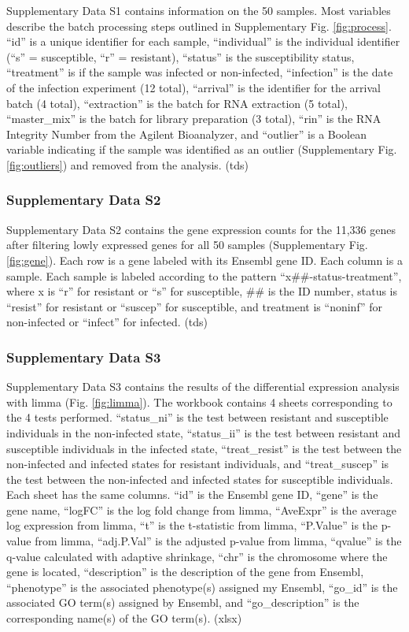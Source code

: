 \documentclass[fleqn,10pt]{wlscirep}
\begin{document}
Supplementary Data S1 contains information on the 50 samples. Most
variables describe the batch processing steps outlined in
Supplementary Fig. \ref{fig:process}. “id” is a unique identifier for
each sample, “individual” is the individual identifier (“s” =
susceptible, “r” = resistant), “status” is the susceptibility status,
“treatment” is if the sample was infected or non-infected, “infection”
is the date of the infection experiment (12 total), “arrival” is the
identifier for the arrival batch (4 total), “extraction” is the batch
for RNA extraction (5 total), “master\_mix” is the batch for library
preparation (3 total), “rin” is the RNA Integrity Number from the
Agilent Bioanalyzer, and “outlier” is a Boolean variable indicating if
the sample was identified as an outlier (Supplementary Fig.
\ref{fig:outliers}) and removed from the analysis. (tds)
\subsubsection*{Supplementary Data S2}

Supplementary Data S2 contains the gene expression counts for the
11,336 genes after filtering lowly expressed genes for all 50 samples
(Supplementary Fig. \ref{fig:gene}). Each row is a gene labeled with
its Ensembl gene ID. Each column is a sample. Each sample is labeled
according to the pattern “x\#\#-status-treatment”, where x is “r” for
resistant or “s” for susceptible, \#\# is the ID number, status is
“resist” for resistant or “suscep” for susceptible, and treatment is
“noninf” for non-infected or “infect” for infected. (tds)
\subsubsection*{Supplementary Data S3}

Supplementary Data S3 contains the results of the differential
expression analysis with limma (Fig. \ref{fig:limma}). The workbook
contains 4 sheets corresponding to the 4 tests performed. “status\_ni”
is the test between resistant and susceptible individuals in the
non-infected state, “status\_ii” is the test between resistant and
susceptible individuals in the infected state, “treat\_resist” is the
test between the non-infected and infected states for resistant
individuals, and “treat\_suscep” is the test between the non-infected
and infected states for susceptible individuals. Each sheet has the
same columns. “id” is the Ensembl gene ID, “gene” is the gene name,
“logFC” is the log fold change from limma, “AveExpr” is the average
log expression from limma, “t” is the t-statistic from limma,
“P.Value” is the p-value from limma, “adj.P.Val” is the adjusted
p-value from limma, “qvalue” is the q-value calculated with adaptive
shrinkage, “chr” is the chromosome where the gene is located,
“description” is the description of the gene from Ensembl, “phenotype”
is the associated phenotype(s) assigned my Ensembl, “go\_id” is the
associated GO term(s) assigned by Ensembl, and “go\_description” is
the corresponding name(s) of the GO term(s). (xlsx)
\end{document}
